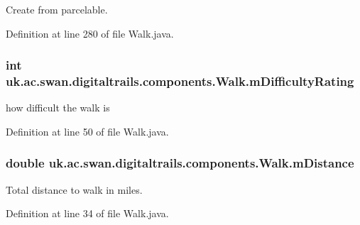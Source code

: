 Create from parcelable. 



Definition at line 280 of file Walk.\+java.

\hypertarget{classuk_1_1ac_1_1swan_1_1digitaltrails_1_1components_1_1_walk_a1a89c2b41426e60b5c42885297fa6846}{
\subsubsection[{m\+Difficulty\+Rating}]{\setlength{\rightskip}{0pt plus 5cm}int uk.\+ac.\+swan.\+digitaltrails.\+components.\+Walk.\+m\+Difficulty\+Rating\hspace{0.3cm}{\ttfamily [private]}}}\label{classuk_1_1ac_1_1swan_1_1digitaltrails_1_1components_1_1_walk_a1a89c2b41426e60b5c42885297fa6846}


how difficult the walk is 



Definition at line 50 of file Walk.\+java.

\hypertarget{classuk_1_1ac_1_1swan_1_1digitaltrails_1_1components_1_1_walk_ae9d7a2acfca54e3d73177d4c7678728b}{
\subsubsection[{m\+Distance}]{\setlength{\rightskip}{0pt plus 5cm}double uk.\+ac.\+swan.\+digitaltrails.\+components.\+Walk.\+m\+Distance\hspace{0.3cm}{\ttfamily [private]}}}\label{classuk_1_1ac_1_1swan_1_1digitaltrails_1_1components_1_1_walk_ae9d7a2acfca54e3d73177d4c7678728b}


Total distance to walk in miles. 



Definition at line 34 of file Walk.\+java.

